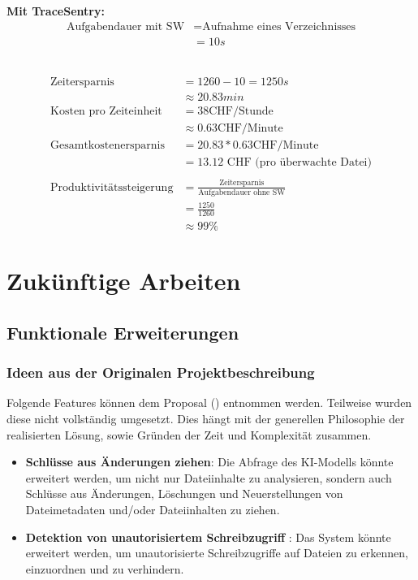 \documentclass[a4paper,12pt]{report}
\begin{document}
    \textbf{Mit TraceSentry:} \\
    \begin{align*}
        \text{Aufgabendauer mit SW} &= \text{Aufnahme eines Verzeichnisses} \\
        &= 10s
    \end{align*}

     \\
    \begin{align*}
        \text{Zeitersparnis} &= 1260 - 10 = 1250s \\
        &\approx 20.83min \\
        \text{Kosten pro Zeiteinheit} &= 38 \text{CHF/Stunde} \\ &\approx 0.63 \text{CHF/Minute} \\
        \text{Gesamtkostenersparnis} &= 20.83 * 0.63 \text{CHF/Minute} \\ &= 13.12 \text{ CHF (pro überwachte Datei)} \\
        \\
        \text{Produktivitätssteigerung} &= \frac{\text{Zeitersparnis}}{\text{Aufgabendauer ohne SW}}
        \\ &= \frac{\text{1250}}{\text{1260}}
        \\ &\approx 99\%
    \end{align*}


    \clearpage


    \section{Zukünftige Arbeiten}\label{sec:zukunftigearbeiten}

    \subsection{Funktionale Erweiterungen}\label{subsec:funktionale-erweiterungen}

    \subsubsection{Ideen aus der Originalen Projektbeschreibung}
    Folgende Features können dem Proposal () entnommen werden.
    Teilweise wurden diese nicht vollständig umgesetzt.
    Dies hängt mit der generellen Philosophie der realisierten Lösung, sowie Gründen der Zeit und Komplexität zusammen.
    \begin{itemize}
        \item \textbf{Schlüsse aus Änderungen ziehen\footnotemark[1]}: Die Abfrage des KI-Modells könnte erweitert werden, um nicht nur Dateiinhalte zu analysieren, sondern auch Schlüsse aus Änderungen, Löschungen und Neuerstellungen von Dateimetadaten und/oder Dateiinhalten zu ziehen.
        \item \textbf{Detektion von unautorisiertem Schreibzugriff \footnotemark[1]}: Das System könnte erweitert werden, um unautorisierte Schreibzugriffe auf Dateien zu erkennen, einzuordnen und zu verhindern.
    \end{itemize}
\end{document}
